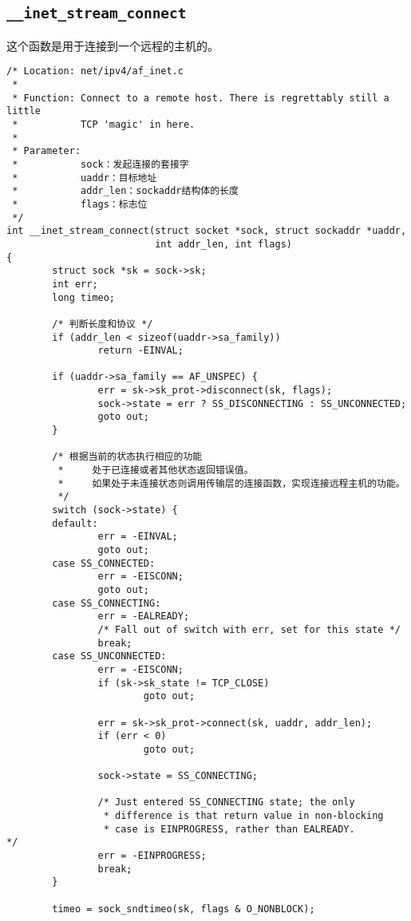 \subsection{\texttt{__inet_stream_connect}}
这个函数是用于连接到一个远程的主机的。
\begin{verbatim}
/* Location: net/ipv4/af_inet.c
 *
 * Function: Connect to a remote host. There is regrettably still a little
 *           TCP 'magic' in here.
 *
 * Parameter: 
 *           sock：发起连接的套接字
 *           uaddr：目标地址
 *           addr_len：sockaddr结构体的长度
 *           flags：标志位
 */
int __inet_stream_connect(struct socket *sock, struct sockaddr *uaddr,
                          int addr_len, int flags)
{
        struct sock *sk = sock->sk;
        int err;
        long timeo;

        /* 判断长度和协议 */
        if (addr_len < sizeof(uaddr->sa_family))
                return -EINVAL;

        if (uaddr->sa_family == AF_UNSPEC) {
                err = sk->sk_prot->disconnect(sk, flags);
                sock->state = err ? SS_DISCONNECTING : SS_UNCONNECTED;
                goto out;
        }

        /* 根据当前的状态执行相应的功能
         *     处于已连接或者其他状态返回错误值。
         *     如果处于未连接状态则调用传输层的连接函数，实现连接远程主机的功能。
         */
        switch (sock->state) {
        default:
                err = -EINVAL;
                goto out;
        case SS_CONNECTED:
                err = -EISCONN;
                goto out;
        case SS_CONNECTING:
                err = -EALREADY;
                /* Fall out of switch with err, set for this state */
                break;
        case SS_UNCONNECTED:
                err = -EISCONN;
                if (sk->sk_state != TCP_CLOSE)
                        goto out;

                err = sk->sk_prot->connect(sk, uaddr, addr_len);
                if (err < 0)
                        goto out;

                sock->state = SS_CONNECTING;

                /* Just entered SS_CONNECTING state; the only
                 * difference is that return value in non-blocking
                 * case is EINPROGRESS, rather than EALREADY.
*/
                err = -EINPROGRESS;
                break;
        }

        timeo = sock_sndtimeo(sk, flags & O_NONBLOCK);


\end{verbatim}

